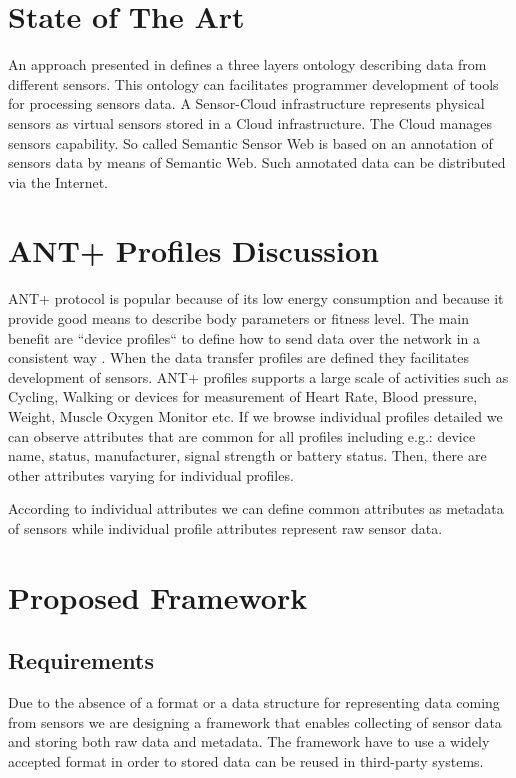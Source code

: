 \documentclass[conference]{IEEEconf}
\begin{document}
\section{State of The Art}\label{sec:state-of-the-art}

An approach presented in \cite{mehmood2014ontology} defines a three layers ontology describing data from different sensors. This ontology can facilitates programmer development of tools for processing sensors data. A Sensor-Cloud infrastructure \cite{5635688} represents physical sensors as virtual sensors stored in a Cloud infrastructure. The Cloud manages sensors capability. So called Semantic Sensor Web \cite{4557983} is based on an annotation of sensors data by means of Semantic Web. Such annotated data can be distributed via the Internet.


\section{ANT+ Profiles Discussion}\label{sec:ant-plus-profiles}
ANT+ protocol is popular because of its low energy consumption and because it provide good means to describe body parameters or fitness level. The main benefit are ``device profiles`` to define how to send data over the network in a consistent way \cite{innovations2013ant}. When the data transfer profiles are defined they facilitates development of sensors. 
ANT+ profiles supports a large scale of activities such as Cycling, Walking or devices for measurement of Heart Rate, Blood pressure, Weight, Muscle Oxygen Monitor etc. If we browse individual profiles detailed we can observe attributes that are common for all profiles including e.g.: device name, status, manufacturer, signal strength or battery status. Then, there are other attributes varying for individual profiles. 

According to individual attributes we can define common attributes as metadata of sensors while individual profile attributes represent raw sensor data. 

\section{Proposed Framework}\label{sec:framework}

\subsection{Requirements}\label{sec:requirements}

Due to the absence of a format or a data structure for representing data coming from sensors we are designing a framework that enables collecting of sensor data and storing both raw data and metadata. The framework have to use a widely accepted format in order to stored data can be reused in third-party systems.
\end{document}
